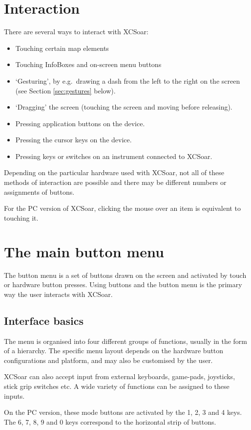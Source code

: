 \section{Interaction}
There are several ways to interact with XCSoar:
\begin{itemize}
\item Touching certain map elements
\item Touching InfoBoxes and on-screen menu buttons
\item `Gesturing', by e.g.\ drawing a dash from the left to the right
  on the screen (see Section \ref{sec:gestures} below).
\item `Dragging' the screen (touching the screen and moving before releasing).
\item Pressing application buttons on the device.
\item Pressing the cursor keys on the device.
\item Pressing keys or switches on an instrument connected to XCSoar.
\end{itemize}
Depending on the particular hardware used with XCSoar, not all of these methods
of interaction are possible and there may be different numbers or assignments
of buttons.

For the PC version of XCSoar, clicking the mouse over an item is equivalent to
touching it.

\section{The main button menu}
The button menu is a set of buttons drawn on the screen and activated by touch
or hardware button presses.  Using buttons and the button menu is the primary
way the user interacts with XCSoar.

\subsection*{Interface basics}
The menu is organised into four different groups of functions, usually in
the form of a hierarchy.  The specific menu layout depends on the
hardware button configurations and platform, and may also be customised by the
user.

XCSoar can also accept input from external keyboards, game-pads, joysticks,
stick grip switches etc. A wide variety of functions can be assigned to these
inputs.

On the PC version, these mode buttons are activated by the
1, 2, 3 and 4 keys.  The 6, 7, 8, 9 and 0 keys correspond to the horizontal
strip of buttons.

